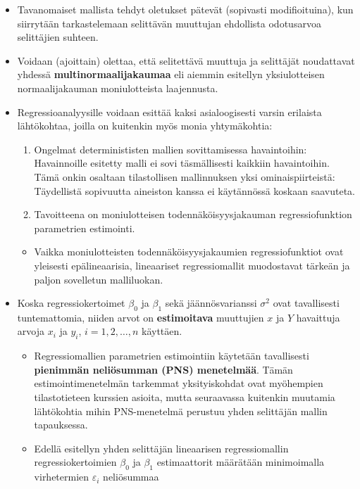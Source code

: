 \documentclass[
]{book}
\providecommand{\tightlist}{%
  \setlength{\itemsep}{0pt}\setlength{\parskip}{0pt}}
\begin{document}
\begin{itemize}
  \begin{itemize}
  \tightlist
  \item
    Tavanomaiset mallista tehdyt oletukset pätevät (sopivasti modifioituina), kun siirrytään tarkastelemaan selittävän muuttujan ehdollista odotusarvoa selittäjien suhteen.
  \item
    Voidaan (ajoittain) olettaa, että selitettävä muuttuja ja selittäjät noudattavat yhdessä \textbf{multinormaalijakaumaa} eli aiemmin esitellyn yksiulotteisen normaalijakauman moniulotteista laajennusta.
  \end{itemize}
\end{itemize}

\hfill\break

\begin{itemize}
\tightlist
\item
  Regressioanalyysille voidaan esittää kaksi asialoogisesti varsin erilaista lähtökohtaa, joilla on kuitenkin myös monia yhtymäkohtia:

  \begin{enumerate}
  \def\labelenumi{\roman{enumi})}
  \tightlist
  \item
    Ongelmat determinististen mallien sovittamisessa havaintoihin: Havainnoille esitetty malli ei sovi täsmällisesti kaikkiin havaintoihin. Tämä onkin osaltaan tilastollisen mallinnuksen yksi ominaispiirteistä: Täydellistä sopivuutta aineiston kanssa ei käytännössä koskaan saavuteta.
  \item
    Tavoitteena on moniulotteisen todennäköisyysjakauman regressiofunktion parametrien estimointi.
  \end{enumerate}

  \begin{itemize}
  \tightlist
  \item
    Vaikka moniulotteisten todennäköisyysjakaumien regressiofunktiot ovat yleisesti epälineaarisia, lineaariset regressiomallit muodostavat tärkeän ja paljon sovelletun malliluokan.
  \end{itemize}
\item
  Koska regressiokertoimet \(\beta_0\) ja \(\beta_1\) sekä jäännösvarianssi \(\sigma^2\) ovat tavallisesti tuntemattomia, niiden arvot on \textbf{estimoitava} muuttujien \(x\) ja \(Y\) havaittuja arvoja \(x_i\) ja \(y_i\), \(i=1,2, \ldots, n\) käyttäen.

  \begin{itemize}
  \tightlist
  \item
    Regressiomallien parametrien estimointiin käytetään tavallisesti \textbf{pienimmän neliösumman (PNS) menetelmää}. Tämän estimointimenetelmän tarkemmat yksityiskohdat ovat myöhempien tilastotieteen kurssien asioita, mutta seuraavassa kuitenkin muutamia lähtökohtia mihin PNS-menetelmä perustuu yhden selittäjän mallin tapauksessa.
  \item
    Edellä esitellyn yhden selittäjän lineaarisen regressiomallin regressiokertoimien \(\beta_0\) ja \(\beta_1\) estimaattorit määrätään minimoimalla virhetermien \(\varepsilon_i\) neliösummaa
  \end{itemize}
\end{itemize}
\end{document}
